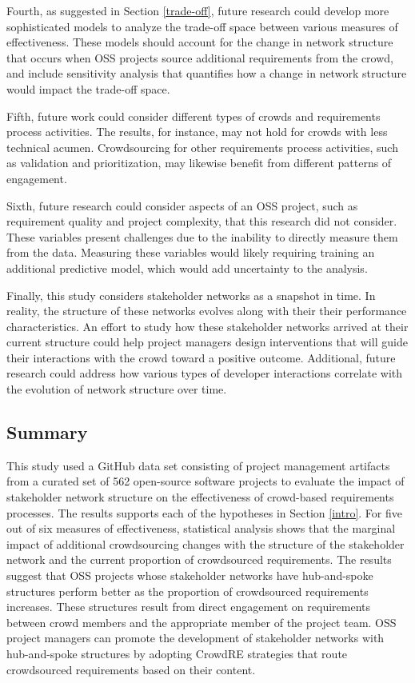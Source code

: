 Fourth, as suggested in Section \ref{trade-off}, future research could develop more sophisticated models to analyze the trade-off space between various measures of effectiveness. These models should account for the change in network structure that occurs when OSS projects source additional requirements from the crowd, and include sensitivity analysis that quantifies how a change in network structure would impact the trade-off space.

Fifth, future work could consider different types of crowds and requirements process activities. The results, for instance, may not hold for crowds with less technical acumen. Crowdsourcing for other requirements process activities, such as validation and prioritization, may likewise benefit from different patterns of engagement. 

Sixth, future research could consider aspects of an OSS project, such as requirement quality and project complexity, that this research did not consider. These variables present challenges due to the inability to directly measure them from the data. Measuring these variables would likely requiring training an additional predictive model, which would add uncertainty to the analysis.

Finally, this study considers stakeholder networks as a snapshot in time. In reality, the structure of these networks evolves along with their their performance characteristics. An effort to study how these stakeholder networks arrived at their current structure could help project managers design interventions that will guide their interactions with the crowd toward a positive outcome. Additional, future research could address how various types of developer interactions correlate with the evolution of network structure over time.

\subsection{Summary}

This study used a GitHub data set consisting of project management artifacts from a curated set of 562 open-source software projects to evaluate the impact of stakeholder network structure on the effectiveness of crowd-based requirements processes. The results supports each of the hypotheses in Section \ref{intro}. For five out of six measures of effectiveness, statistical analysis shows that the marginal impact of additional crowdsourcing changes with the structure of the stakeholder network and the current proportion of crowdsourced requirements. The results suggest that OSS projects whose stakeholder networks have hub-and-spoke structures perform better as the proportion of crowdsourced requirements increases. These structures result from direct engagement on requirements between crowd members and the appropriate member of the project team. OSS project managers can promote the development of stakeholder networks with hub-and-spoke structures by adopting CrowdRE strategies that route crowdsourced requirements based on their content.

